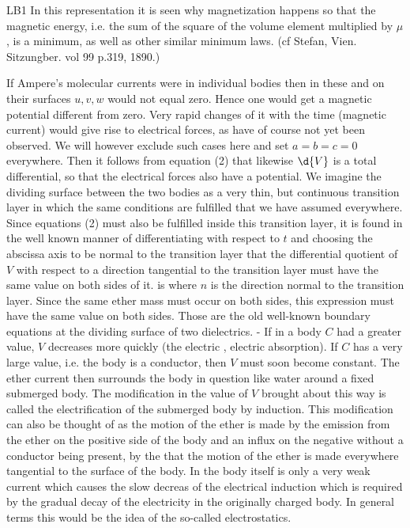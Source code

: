 \begin{paper}{LB1}
In this representation it is seen why magnetization happens so that the magnetic energy, i.e. the sum of the square of the volume element multiplied by $\mu$, is a minimum, as well as other similar minimum laws. (cf Stefan, Vien. Sitzungber. vol 99 p.319, 1890.)

If Ampere's molecular currents were in individual bodies then in these and on their surfaces $u,v,w$ would not equal zero. Hence one would get a magnetic potential different from zero. Very rapid changes of it with the time (magnetic current) would give rise to electrical forces, as have of course not yet been observed. We will however exclude such cases here and set $a=b=c=0$ everywhere. Then it follows from equation (2) that
likewise $\d{V}$ is a total differential, so that the electrical forces also have a potential. We imagine the dividing surface between the two bodies as a very thin, but continuous transition layer in which the same conditions are fulfilled that we have assumed everywhere. Since equations (2) must also be fulfilled inside this transition layer, it is found in the well known manner of differentiating with respect to $t$ and choosing the abscissa axis to be normal to the transition layer that the differential quotient of $V$ with respect to a direction tangential to the transition layer must have the same value on both sides of it.  is
where $n$ is the direction normal to the transition layer. Since the same ether mass must occur on both sides, this expression must have the same value on both sides. Those are the old well-known boundary equations at the dividing surface of two dielectrics.
-
If in a body $C$ had a greater value, $V$ decreases more quickly (the electric , electric absorption). If $C$ has a very large value, i.e. the body is a conductor, then $V$ must soon become constant. The ether current then surrounds the body in question like water around a fixed submerged body. The modification in the value of $V$ brought about this way is called the electrification of the submerged body by induction. This modification can also be thought of as the motion of the ether is made by the emission from the ether on the positive side of the body and an influx on the negative without a conductor being present, by the  that the motion of the ether is made everywhere tangential to the surface of the body. In the body itself is only a very weak current which causes the slow decreas of the electrical induction which is required by the gradual decay of the electricity in the originally charged body. In general terms this would be the idea of the so-called electrostatics.


\end{paper}
